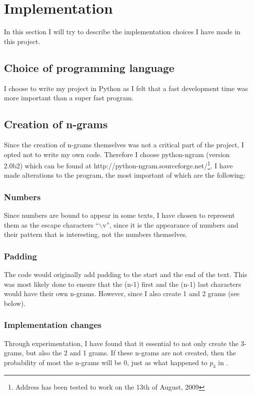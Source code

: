 \section{Implementation}
\label{implementation}

In this section I will try to describe the implementation choices I have made in this project.

\subsection{Choice of programming language}
I choose to write my project in Python as I felt that a fast development time was more important than a super fast program.

\subsection{Creation of n-grams}
Since the creation of n-grams themselves was not a critical part of the project, I opted not to write my own code. Therefore I choose python-ngram (version 2.0b2) which can be found at http://python-ngram.sourceforge.net/\footnote{Address has been tested to work on the 13th of August, 2009}. I have made alterations to the program, the most important of which are the following:

\subsubsection*{Numbers}
Since numbers are bound to appear in some texts, I have chosen to represent them as the escape characters ``$\backslash$v'', since it is the appearance of numbers and their pattern that is interesting, not the numbers themselves.

\subsubsection*{Padding}
The code would originally add padding to the start and the end of the text. This was most likely done to ensure that the (n-1) first and the (n-1) last characters would have their own n-grams. However, since I also create 1 and 2 grams (see below).

\subsubsection*{Implementation changes}
Through experimentation, I have found that it essential to not only create the 3-grams, but also the 2 and 1 grams. If these n-grams are not created, then the probability of most the n-grams will be 0, just as what happened to $p_3$ in .

